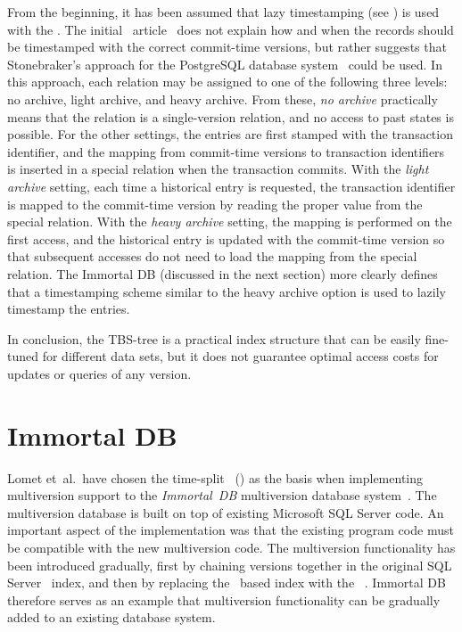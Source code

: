 From the beginning, it has been assumed that lazy timestamping (see
) is used with the \TSBtree.
The initial \TSBtree\ article~\cite{lomet:1989:tsb} does not explain how and
when the records should be timestamped with the correct commit-time versions,
but rather suggests that Stonebraker's approach for the PostgreSQL
database system~\cite{stonebraker:1987:postgres} could be used.
In this approach, each relation may be assigned to one of the following three
levels: no archive, light archive, and heavy archive. 
From these, \emph{no archive} practically means that the relation is a
single-version relation, and no access to past states is possible.
For the other settings, the entries are first stamped with the transaction
identifier, and the mapping from commit-time versions to transaction
identifiers is inserted in a special relation when the transaction commits. 
With the \emph{light archive} setting, each time a historical entry is
requested, the transaction identifier is mapped to the commit-time version by
reading the proper value from the special relation.
With the \emph{heavy archive} setting, the mapping is performed on the first
access, and the historical entry is updated with the commit-time version so
that subsequent accesses do not need to load the mapping from the special
relation.
The Immortal DB (discussed in the next section) more clearly defines that a
timestamping scheme similar to the heavy archive option is used to lazily
timestamp the entries.

In conclusion, the TBS-tree is a practical index structure that can be easily
fine-tuned for different data sets, but it does not guarantee optimal
access costs for updates or queries of any version.



\section{Immortal DB}
\label{sec:tsbmvbt:immortaldb}
\label{def:immortaldb}

Lomet et~al.\ have chosen the time-split \Btree~(\TSBtree) as the
basis when implementing multiversion support to the \emph{Immortal~DB}
multiversion database
system~\cite{lomet:2005:immortaldb,lomet:2006:transactiontime,lomet:2008:version-compression,lomet:2009:improving}.
The multiversion database is built on top of existing Microsoft SQL Server
code. 
An important aspect of the implementation was that the existing program code
must be compatible with the new multiversion code.
The multiversion functionality has been introduced gradually, first by
chaining versions together in the original SQL Server \Btree\ index, and then
by replacing the \Btree\ based index with the
\TSBtree~\cite{lomet:2006:transactiontime,lomet:2008:version-compression}.
Immortal DB therefore serves as an example that multiversion functionality
can be gradually added to an existing database system.

